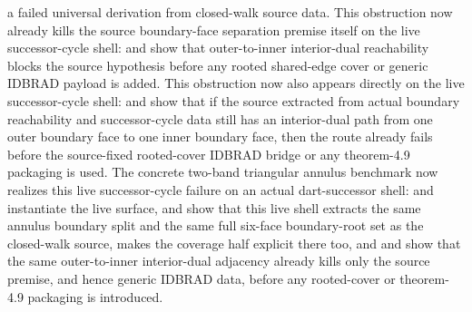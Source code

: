 \documentclass[11pt]{article}
\begin{document}
a failed universal derivation from closed-walk source data.  This obstruction
now already kills the source boundary-face separation premise itself on the
live successor-cycle shell:
and
show that outer-to-inner interior-dual reachability blocks the source
 hypothesis before any rooted shared-edge cover or generic
IDBRAD payload is added.  This obstruction
now also appears directly on the live successor-cycle shell:
and
show that if the source extracted from actual boundary reachability and
successor-cycle data still has an interior-dual path from one outer boundary
face to one inner boundary face, then the route already fails before the
source-fixed rooted-cover IDBRAD bridge or any theorem-4.9 packaging is used.
The concrete two-band triangular annulus benchmark now realizes this live
successor-cycle failure on an actual dart-successor shell:
 and
instantiate the live surface,
 and
 show that this live shell
extracts the same annulus boundary split and the same full six-face
boundary-root set as the closed-walk source,
 makes the coverage
half explicit there too, and
and
show that the same outer-to-inner interior-dual adjacency already kills only
the source  premise, and hence generic IDBRAD data, before any
rooted-cover or theorem-4.9 packaging is introduced.
\end{document}
